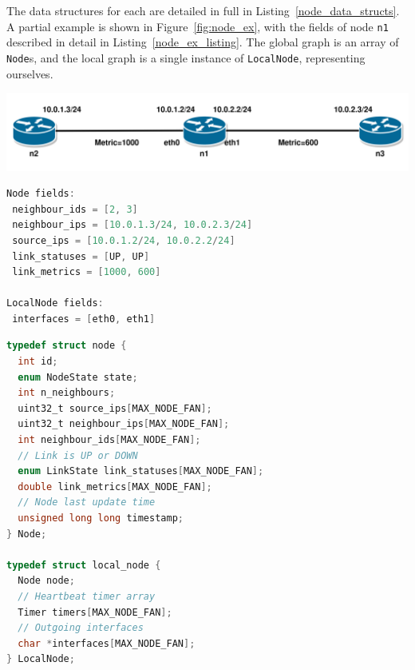 \documentclass[withindex,glossary,openany]{cam-thesis}
\begin{document}
The data structures for each are detailed in full in Listing~\ref{node_data_structs}. A partial example is shown in Figure~\ref{fig:node_ex}, with the fields of node \texttt{n1} described in detail in Listing~\ref{node_ex_listing}. The global graph is an array of \texttt{Node}s, and the local graph is a single instance of \texttt{LocalNode}, representing ourselves.

\begin{center}
\begin{minipage}{0.9\textwidth} \centering
	\includegraphics[width=1\textwidth]{node}
	\label{fig:node_ex}
\end{minipage}
\end{center}

\begin{minipage}{1\textwidth} \centering
\begin{lstlisting}[language=C, label=node_ex_listing, frame=tb, columns=fullflexible, caption=Partial example of fields of \texttt{Node} and \texttt{LocalNode}]
Node fields:
 neighbour_ids = [2, 3]
 neighbour_ips = [10.0.1.3/24, 10.0.2.3/24]
 source_ips = [10.0.1.2/24, 10.0.2.2/24]
 link_statuses = [UP, UP]
 link_metrics = [1000, 600]

LocalNode fields:
 interfaces = [eth0, eth1]
\end{lstlisting}
\end{minipage}

\begin{minipage}{1\textwidth} \centering
\begin{lstlisting}[language=C, label=node_data_structs, frame=tb, columns=fullflexible, caption=C source code for \texttt{Node} and \texttt{LocalNode} data structures]
typedef struct node {
  int id;
  enum NodeState state;
  int n_neighbours;
  uint32_t source_ips[MAX_NODE_FAN];
  uint32_t neighbour_ips[MAX_NODE_FAN];
  int neighbour_ids[MAX_NODE_FAN];
  // Link is UP or DOWN
  enum LinkState link_statuses[MAX_NODE_FAN];
  double link_metrics[MAX_NODE_FAN];
  // Node last update time
  unsigned long long timestamp;
} Node;

typedef struct local_node {
  Node node;
  // Heartbeat timer array
  Timer timers[MAX_NODE_FAN];
  // Outgoing interfaces
  char *interfaces[MAX_NODE_FAN];
} LocalNode;
\end{lstlisting}
\end{minipage}
\end{document}
